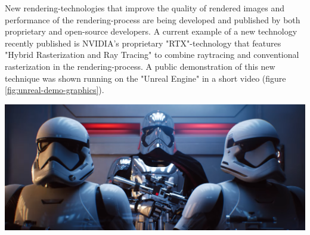 New rendering-technologies that improve the quality of rendered images and performance of the rendering-process are being developed and published by both proprietary and open-source developers. A current example of a new technology recently published is NVIDIA's proprietary "RTX"-technology \cite{NVIDIARTX} that features "Hybrid Rasterization and Ray Tracing" \cite{NVIDIARayTracing} to combine raytracing and conventional rasterization in the rendering-process. A public demonstration of this new technique was shown running on the "Unreal Engine" in a short video (figure \ref{fig:unreal-demo-graphics})\cite{UnrealDemoReflections}.
\begin{center}
\noindent\includegraphics[width=14cm]{tex/img/ch05/UnrealGraphicsDemo.png}
\label{fig:unreal-demo-graphics}
\end{center}

